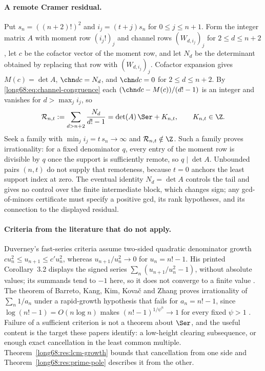 \paragraph{A remote Cramer residual.}
Put $s_n=((n+2)!)^2$ and $i_j=(t+j)s_n$ for $0\le j\le n+1$.  Form the
integer matrix $A$ with moment row $(i_j!)_j$ and channel rows
$(W_{d,i_j})_j$ for $2\le d\le n+2$, let $c$ be the cofactor vector of the
moment row, and let $N_d$ be the determinant obtained by replacing that row
with $(W_{d,i_j})_j$.  Cofactor expansion gives $M(c)=\det A$,
$\chn dc=N_d$, and $\chn dc=0$ for $2\le d\le n+2$.  By
\eqref{long68:eq:channel-congruence} each $(\chn dc-M(c))/(d!-1)$ is an integer and
vanishes for $d>\max_ji_j$, so
\[
 \mathcal R_{n,t}:=\sum_{d>n+2}\frac{N_d}{d!-1}
 =\det(A)\,\Ser+K_{n,t},\qquad K_{n,t}\in\Z .
\]
Seek a family with $\min_ji_j=t\,s_n\to\infty$ and
$\mathcal R_{n,t}\notin\Z$.  Such a family proves irrationality: for a fixed
denominator $q$, every entry of the moment row is divisible by $q$ once the
support is sufficiently remote, so $q\mid\det A$.  Unbounded pairs $(n,t)$ do
not supply that remoteness, because $t=0$ anchors the least support index at
zero.  The eventual identity $N_d=\det A$ controls the tail and gives no
control over the finite intermediate block, which changes sign; any
gcd-of-minors certificate must specify a positive gcd, its rank hypotheses,
and its connection to the displayed residual.

\paragraph{Criteria from the literature that do not apply.}
Duverney's fast-series criteria assume two-sided quadratic denominator growth
$cu_n^2\le u_{n+1}\le c'u_n^2$, whereas $u_{n+1}/u_n^2\to0$ for
$u_n=n!-1$.  His printed Corollary~3.2 displays the signed series
$\sum_n(u_{n+1}/u_n^2-1)$, without absolute values; its summands tend to
$-1$ here, so it does not converge to a finite value
\cite[pp.~275, 285--287]{duverney}.  The theorem of Barreto, Kang, Kim,
Kova\v{c} and Zhang proves irrationality of $\sum_n1/a_n$ under a
rapid-growth hypothesis that fails for $a_n=n!-1$, since
$\log(n!-1)=O(n\log n)$ makes $(n!-1)^{1/\psi^n}\to1$ for every fixed
$\psi>1$ \cite[Thms.~2--3 and Rem.~4]{barreto-et-al}.  Failure of a
sufficient criterion is not a theorem about $\Ser$, and the useful content is
the target these papers identify: a low-height clearing subsequence, or
enough exact cancellation in the least common multiple.
Theorem~\ref{long68:res:lcm-growth} bounds that cancellation from one side and
Theorem~\ref{long68:res:prime-pole} describes it from the other.

